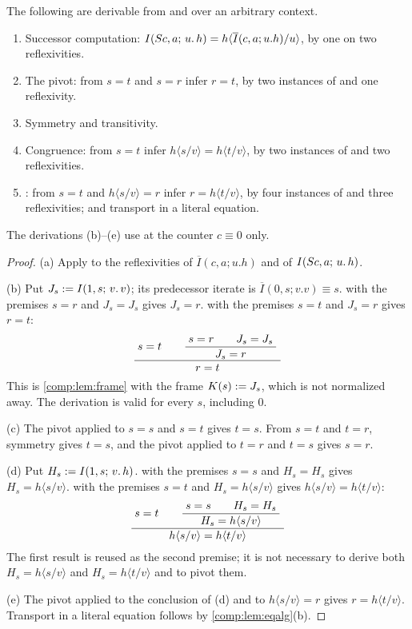 \begin{lemma}
\label{comp:lem:stepderived}
The following are derivable from  and  over
an arbitrary context.
\begin{enumerate}[label=(\alph*)]
\item Successor computation: $I(S c,a;\,u.\,h)
 =h\langle\overline{I}(c,a;u.h)/u\rangle$, by one  on two
 reflexivities.
\item The pivot: from $s=t$ and $s=r$ infer $r=t$, by two instances of
  and one reflexivity.
\item Symmetry and transitivity.
\item Congruence: from $s=t$ infer $h\langle s/v\rangle=h\langle
 t/v\rangle$, by two instances of  and two reflexivities.
\item {}: from $s=t$ and $h\langle s/v\rangle=r$ infer
 $r=h\langle t/v\rangle$, by four instances of  and three
 reflexivities; and transport in a literal equation.
\end{enumerate}
The derivations (b)--(e) use  at the counter $c\equiv0$ only.
\end{lemma}

\begin{proof}
(a) Apply  to the reflexivities of $\overline{I}(c,a;u.h)$
and of $I(S c,a;\,u.\,h)$.

(b) Put $J_s\mathrel{:=}I(1,s;\,v.\,v)$; its predecessor iterate is
$\overline{I}(0,s;v.v)\equiv s$.  with the premises $s=r$ and
$J_s=J_s$ gives $J_s=r$.  with the premises $s=t$ and $J_s=r$
gives $r=t$:
\[
 \dfrac{\;s=t\qquad\dfrac{\;s=r\qquad J_s=J_s\;}{\;J_s=r\;}\;}{\;r=t\;}
\]
This is \cref{comp:lem:frame} with the frame $K(s)\mathrel{:=} J_s$, which is not
normalized away. The derivation is valid for every $s$, including $0$.

(c) The pivot applied to $s=s$ and $s=t$ gives $t=s$. From $s=t$ and $t=r$,
symmetry gives $t=s$, and the pivot applied to $t=r$ and $t=s$ gives $s=r$.

(d) Put $H_s\mathrel{:=}I(1,s;\,v.\,h)$.  with the premises $s=s$
and $H_s=H_s$ gives $H_s=h\langle s/v\rangle$.  with the
premises $s=t$ and $H_s=h\langle s/v\rangle$ gives
$h\langle s/v\rangle=h\langle t/v\rangle$:
\[
 \dfrac{\;s=t\qquad
          \dfrac{\;s=s\qquad H_s=H_s\;}{\;H_s=h\langle s/v\rangle\;}\;}{\;h\langle s/v\rangle=h\langle t/v\rangle\;}
\]
The first result is reused as the second premise; it is not necessary to
derive both $H_s=h\langle s/v\rangle$ and $H_s=h\langle t/v\rangle$ and to
pivot them.

(e) The pivot applied to the conclusion of (d) and to
$h\langle s/v\rangle=r$ gives $r=h\langle t/v\rangle$. Transport in a
literal equation follows by \cref{comp:lem:eqalg}(b).
\end{proof}

